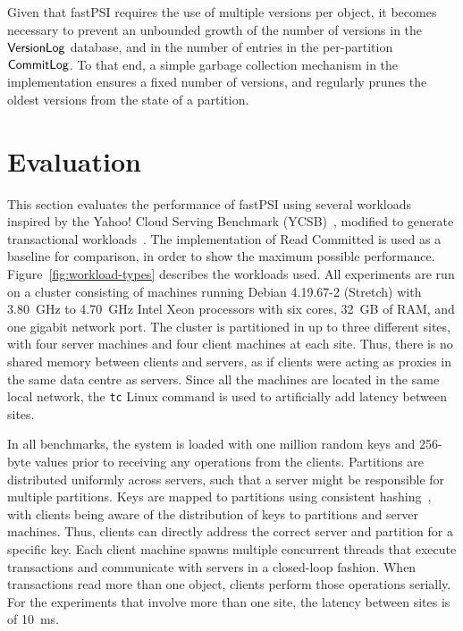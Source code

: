 Given that fastPSI requires the use of multiple versions per object, it becomes necessary to prevent an unbounded growth of the number of versions in the $\mathsf{VersionLog}$ database, and in the number of entries in the per-partition $\mathsf{CommitLog}$. To that end, a simple garbage collection mechanism in the implementation ensures a fixed number of versions, and regularly prunes the oldest versions from the state of a partition.

\section{Evaluation}

This section evaluates the performance of fastPSI using several workloads inspired by the Yahoo! Cloud Serving Benchmark (YCSB)~\citep{ycsb}, modified to generate transactional workloads~\citep{ardekani_nmsi, ardekani_gdur}. The implementation of Read Committed is used as a baseline for comparison, in order to show the maximum possible performance. Figure~\ref{fig:workload-types} describes the workloads used. All experiments are run on a cluster consisting of machines running Debian 4.19.67-2 (Stretch) with 3.80~GHz to 4.70~GHz Intel Xeon processors with six cores, 32~GB of RAM, and one gigabit network port. The cluster is partitioned in up to three different sites, with four server machines and four client machines at each site. Thus, there is no shared memory between clients and servers, as if clients were acting as proxies in the same data centre as servers. Since all the machines are located in the same local network, the \texttt{tc} Linux command is used to artificially add latency between sites.

In all benchmarks, the system is loaded with one million random keys and 256-byte values prior to receiving any operations from the clients. Partitions are distributed uniformly across servers, such that a server might be responsible for multiple partitions. Keys are mapped to partitions using consistent hashing~\citep{karger_chashing}, with clients being aware of the distribution of keys to partitions and server machines. Thus, clients can directly address the correct server and partition for a specific key. Each client machine spawns multiple concurrent threads that execute transactions and communicate with servers in a closed-loop fashion. When transactions read more than one object, clients perform those operations serially. For the experiments that involve more than one site, the latency between sites is of 10~ms.

